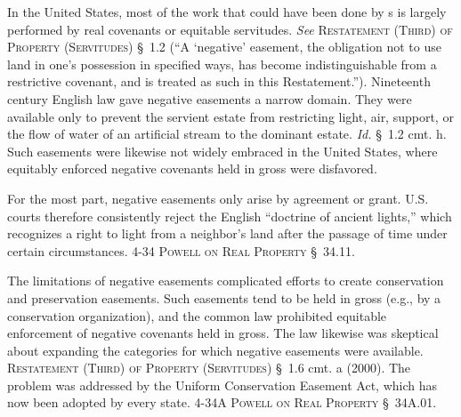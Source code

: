 In the United States, most of the work that could have been done by
s is largely performed by real covenants or equitable
servitudes. \emph{See} \textsc{Restatement (Third) of
Property (Servitudes)} \S~1.2 (``A `negative' easement, the obligation not to
use land in one's possession in specified ways, has become indistinguishable
from a restrictive covenant, and is treated as such in this Restatement.'').
Nineteenth century English law gave negative easements a narrow domain. They
were available only to prevent the servient estate from restricting light, air,
support, or the flow of water of an artificial stream to the dominant estate.
\textit{Id.} \S~1.2 cmt. h. Such easements were likewise not widely embraced in
the United States, where equitably enforced negative covenants held in gross
were disfavored. 

For the most part, negative easements only arise by agreement or grant. U.S.
courts therefore consistently reject the English ``doctrine of ancient lights,''
which recognizes a right to light from a neighbor's land after the passage of
time under certain circumstances. 4-34 \textsc{Powell on Real Property}
\S~34.11.

The limitations of negative easements complicated efforts to create conservation
and preservation easements. Such easements tend to be held in gross (e.g., by a
conservation organization), and the common law prohibited equitable enforcement
of negative covenants held in gross. The law likewise was skeptical about
expanding the categories for which negative easements were available.
\textsc{Restatement (Third) of Property (Servitudes)} \S~1.6 cmt. a (2000). The problem
was addressed by the Uniform Conservation Easement Act, which has now been
adopted by every state.  4-34A \textsc{Powell on Real Property} \S~34A.01.


